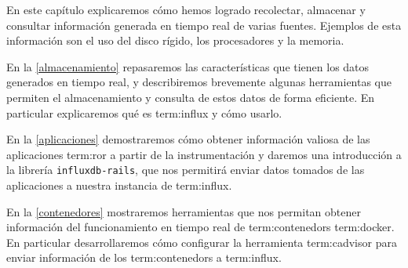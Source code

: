 En este capítulo explicaremos cómo hemos logrado recolectar, almacenar y
consultar información generada en tiempo real de varias fuentes. Ejemplos de
esta información son el uso del disco rígido, los procesadores y la memoria.

En la \autoref{almacenamiento} repasaremos las características que tienen los
datos generados en tiempo real, y describiremos brevemente algunas herramientas
que permiten el almacenamiento y consulta de estos datos de forma eficiente. En
particular explicaremos qué es \gls{term:influx} y cómo usarlo.

En la \autoref{aplicaciones} demostraremos cómo obtener información valiosa de
las aplicaciones \gls{term:ror} a partir de la instrumentación y daremos una
introducción a la librería \texttt{influxdb-rails}, que nos permitirá enviar
datos tomados de las aplicaciones a nuestra instancia de \gls{term:influx}.

En la \autoref{contenedores} mostraremos herramientas que nos permitan obtener
información del funcionamiento en tiempo real de \glspl{term:contenedor}
\gls{term:docker}. En particular desarrollaremos cómo configurar la herramienta
\gls{term:cadvisor} para enviar información de los \glspl{term:contenedor} a
\gls{term:influx}.
